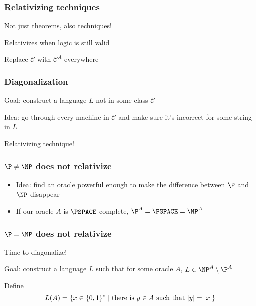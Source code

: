 \documentclass[xcolor={usenames,dvipsnames}]{beamer}
\DeclarePairedDelimiter{\abs}{\lvert}{\rvert}
\begin{document}
\begin{frame}
  \frametitle{Relativizing techniques}
  Not just theorems, also techniques!

  \bigskip
  Relativizes when logic is still valid

  \bigskip
  Replace $\mathcal{C}$ with $\mathcal{C}^{A}$ everywhere
\end{frame}

\begin{frame}
  \frametitle{Diagonalization}
  Goal: construct a language $L$ not in some class $\mathcal{C}$

  \bigskip
  Idea: go through every machine in $\mathcal{C}$ and make sure it's incorrect for some
  string in $L$

  \bigskip
  Relativizing technique!
\end{frame}

\begin{frame}
  \frametitle{$\P \ne \NP$ does not relativize}
  \begin{itemize}
    \item Idea: find an oracle powerful enough to make the difference between
          $\P$ and $\NP$ disappear
    \item If our oracle $A$ is $\PSPACE$-complete, $\P^{A} = \PSPACE = \NP^{A}$
  \end{itemize}
\end{frame}

\begin{frame}
  \frametitle{$\P = \NP$ does not relativize}
    Time to diagonalize!

    \bigskip
    Goal: construct a language $L$ such that for some oracle $A$,
          $L \in \NP^{A} \setminus \P^{A}$

    \bigskip
    Define
    \[
      L(A) = \{x \in \{0, 1\}^{*} \mid \text{there is } y \in A \text{ such that
      } \abs{y} = \abs{x}\}
    \]
\end{frame}
\end{document}
